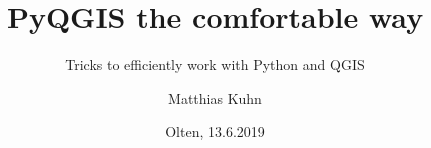 \title{PyQGIS the comfortable way}
\subtitle{Tricks to efficiently work with Python and QGIS}
\author[Matthias] %
{Matthias Kuhn}

\date{Olten, 13.6.2019}
\subject{Computer Science}




	\frame[plain]{\titlepage}
	

	
	
	
	
	
	
	

